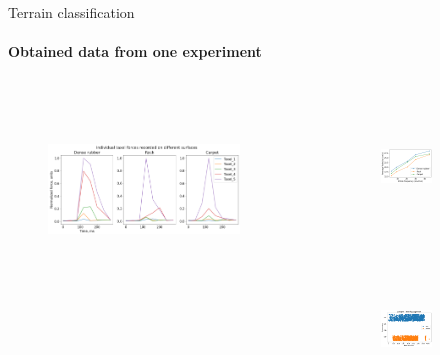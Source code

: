 \documentclass[aspectratio=169,xcolor=table]{beamer}
\begin{document}
\begin{frame}[t]{Terrain classification}
    \framesubtitle{Obtained data from one experiment}
    \begin{columns}[T,onlytextwidth]
        \begin{column}{0.60\textwidth}
            \begin{figure}[H]
                \centering\includegraphics[height=5cm,width=1\textwidth,keepaspectratio]{s_shape_leg/TaxelIndForce.png}
            \end{figure}
        \end{column}
        \begin{column}{0.35\textwidth}
            \vspace{-1.6cm}
            \begin{figure}[H]
                \begin{subfigure}{0.99\textwidth}
                    \centering\includegraphics[height=3.8cm,width=1\textwidth,keepaspectratio]{s_shape_leg/avg_lin_vel_rev_min.png} 
                \end{subfigure}

                \begin{subfigure}{0.99\textwidth}
                    \centering\includegraphics[height=3.8cm,width=1\textwidth,keepaspectratio]{s_shape_leg/segment6_compare_front.png}
                \end{subfigure}
                

            \end{figure}
        \end{column}
    \end{columns}
\end{frame}
\end{document}
